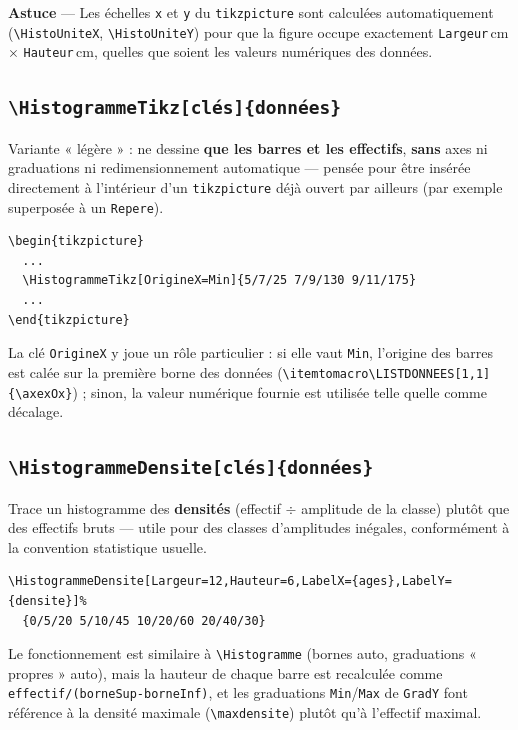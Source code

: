 \documentclass[11pt,a4paper]{article}
\newcommand{\cmdname}[1]{\texttt{\textbackslash#1}}
\begin{document}
\begin{noteDiag}
\textbf{Astuce} — Les échelles \texttt{x} et \texttt{y} du \texttt{tikzpicture} sont calculées automatiquement (\texttt{\textbackslash HistoUniteX}, \texttt{\textbackslash HistoUniteY}) pour que la figure occupe exactement \texttt{Largeur}\,cm $\times$ \texttt{Hauteur}\,cm, quelles que soient les valeurs numériques des données.
\end{noteDiag}

\subsection{\cmdname{HistogrammeTikz[clés]\{données\}}}

Variante « légère » : ne dessine \textbf{que les barres et les effectifs}, \textbf{sans} axes ni graduations ni redimensionnement automatique — pensée pour être insérée directement à l'intérieur d'un \texttt{tikzpicture} déjà ouvert par ailleurs (par exemple superposée à un \texttt{Repere}).

\begin{lstlisting}
\begin{tikzpicture}
  ...
  \HistogrammeTikz[OrigineX=Min]{5/7/25 7/9/130 9/11/175}
  ...
\end{tikzpicture}
\end{lstlisting}

La clé \texttt{OrigineX} y joue un rôle particulier : si elle vaut \texttt{Min}, l'origine des barres est calée sur la première borne des données (\texttt{\textbackslash itemtomacro\textbackslash LISTDONNEES[1,1]\{\textbackslash axexOx\}}) ; sinon, la valeur numérique fournie est utilisée telle quelle comme décalage.

\subsection{\cmdname{HistogrammeDensite[clés]\{données\}}}

Trace un histogramme des \textbf{densités} (effectif $\div$ amplitude de la classe) plutôt que des effectifs bruts — utile pour des classes d'amplitudes inégales, conformément à la convention statistique usuelle.

\begin{lstlisting}
\HistogrammeDensite[Largeur=12,Hauteur=6,LabelX={ages},LabelY={densite}]%
  {0/5/20 5/10/45 10/20/60 20/40/30}
\end{lstlisting}

Le fonctionnement est similaire à \cmdname{Histogramme} (bornes auto, graduations « propres » auto), mais la hauteur de chaque barre est recalculée comme \texttt{effectif/(borneSup-borneInf)}, et les graduations \texttt{Min}/\texttt{Max} de \texttt{GradY} font référence à la densité maximale (\texttt{\textbackslash maxdensite}) plutôt qu'à l'effectif maximal.
\end{document}
